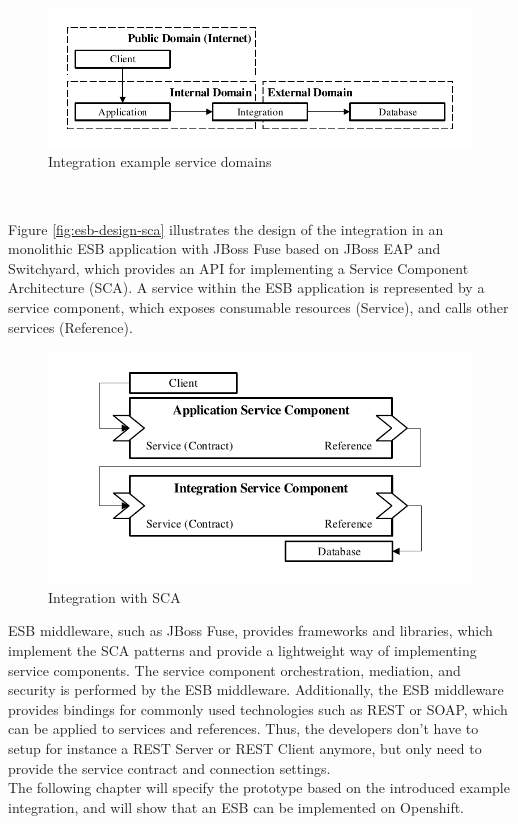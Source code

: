 \begin{figure}[htbp]
	\centering
	\includegraphics[scale=1]{images/esb-integration-example.pdf}
	\caption{Integration example service domains}
	\label{fig:esb-design-services}
\end{figure}
\ \newpage

Figure \vref{fig:esb-design-sca} illustrates the design of the integration in an monolithic ESB application with JBoss Fuse based on JBoss EAP and Switchyard, which provides an API for implementing a Service Component Architecture (SCA). A service within the ESB application is represented by a service component, which exposes consumable resources (Service), and calls other services (Reference)\cite{Switchyard}. 

\begin{figure}[htbp]
	\centering
	\includegraphics[scale=1]{images/esb-sca-example.pdf}
	\caption{Integration with SCA}
	\label{fig:esb-design-sca}
\end{figure}
  
ESB middleware, such as JBoss Fuse, provides frameworks and libraries, which implement the SCA patterns and provide a lightweight way of implementing service components. The service component orchestration, mediation, and security is performed by the ESB middleware. Additionally, the ESB middleware provides bindings for commonly used technologies such as REST or SOAP, which can be applied to services and references. Thus, the developers don't have to setup for instance a REST Server or REST Client anymore, but only need to provide the service contract and connection settings\cite{MicroSoa2008, Richards2015}.\\

The following chapter will specify the prototype based on the introduced example integration, and will show that an ESB can be implemented on Openshift.